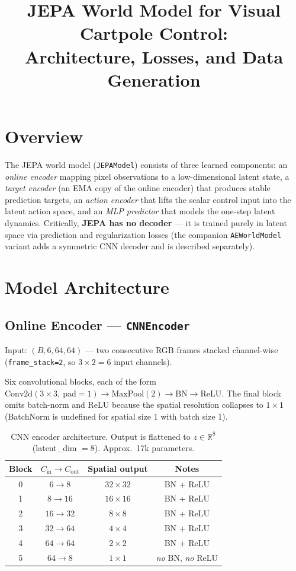 \documentclass[11pt]{article}
\title{JEPA World Model for Visual Cartpole Control:\\
Architecture, Losses, and Data Generation}
\author{}
\date{}
\newcommand{\R}{\mathbb{R}}
\begin{document}
\maketitle

\section{Overview}

The JEPA world model (\texttt{JEPAModel}) consists of three learned components:
an \emph{online encoder} mapping pixel observations to a low-dimensional latent
state, a \emph{target encoder} (an EMA copy of the online encoder) that produces
stable prediction targets, an \emph{action encoder} that lifts the scalar control
input into the latent action space, and an \emph{MLP predictor} that models the
one-step latent dynamics. Critically, \textbf{JEPA has no decoder} — it is
trained purely in latent space via prediction and regularization losses (the
companion \texttt{AEWorldModel} variant adds a symmetric CNN decoder and is
described separately).

\section{Model Architecture}

\subsection{Online Encoder --- \texttt{CNNEncoder}}

Input: $(B, 6, 64, 64)$ --- two consecutive RGB frames stacked channel-wise
(\texttt{frame\_stack=2}, so $3 \times 2 = 6$ input channels).

Six convolutional blocks, each of the form
$\text{Conv2d}(3{\times}3,\ \text{pad}{=}1) \to \text{MaxPool}(2) \to \text{BN} \to \text{ReLU}$.
The final block omits batch-norm and ReLU because the spatial resolution collapses
to $1{\times}1$ (BatchNorm is undefined for spatial size 1 with batch size 1).

\begin{table}[h]
\centering
\begin{tabular}{@{}cccc@{}}
\toprule
Block & $C_{\text{in}} \to C_{\text{out}}$ & Spatial output & Notes \\
\midrule
0 & $6 \to 8$   & $32\times32$ & BN + ReLU \\
1 & $8 \to 16$  & $16\times16$ & BN + ReLU \\
2 & $16 \to 32$ & $8\times8$   & BN + ReLU \\
3 & $32 \to 64$ & $4\times4$   & BN + ReLU \\
4 & $64 \to 64$ & $2\times2$   & BN + ReLU \\
5 & $64 \to 8$  & $1\times1$   & \emph{no} BN, \emph{no} ReLU \\
\bottomrule
\end{tabular}
\caption{CNN encoder architecture. Output is flattened to $z \in \R^{8}$
(latent\_dim $= 8$). Approx.\ 17k parameters.}
\end{table}
\end{document}

